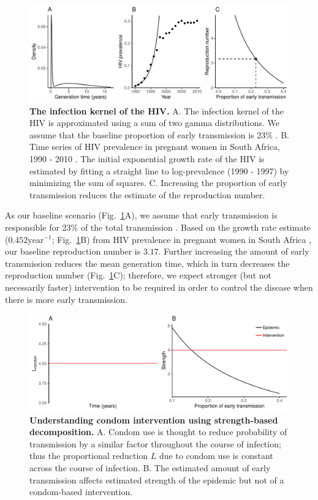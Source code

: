 \documentclass[12pt]{article}\usepackage[]{graphicx}\usepackage[]{color}
\newcommand{\figref}[1]{Fig.~\ref{fig:#1}}
\newcommand{\figlab}[1]{\label{fig:#1}}
\begin{document}
\begin{figure}[!t]
\includegraphics[width=\textwidth]{../figure/figure1.pdf}
\caption{
\textbf{The infection kernel of the HIV.}
A. The infection kernel of the HIV is approximated using a sum of two gamma distributions. We assume that the baseline proportion of early transmission is 23\% \citep{hayes2006amplified}.
B. Time series of HIV prevalence in pregnant women in South Africa, 1990 - 2010 \citep{barron2013eliminating}. The initial exponential growth rate of the HIV is estimated by fitting a straight line to log-prevalence (1990 - 1997) by minimizing the sum of squares.
C. Increasing the proportion of early transmission reduces the estimate of the reproduction number.
}
\figlab{example}
\end{figure}

As our baseline scenario (\figref{example}A), we assume that early transmission is responsible for 23\% of the total transmission \citep{hayes2006amplified}.
Based on the growth rate estimate ($0.452 \textrm{year}^{-1}$; \figref{example}B) from HIV prevalence in pregnant women in South Africa \citep{barron2013eliminating}, our baseline reproduction number is $3.17$.
Further increasing the amount of early transmission reduces the mean generation time, which in turn decreases the reproduction number (\figref{example}C);
therefore, we expect stronger (but not necessarily faster) intervention to be required in order to control the disease when there is more early transmission.

\begin{figure}[!t]
\includegraphics[width=\textwidth]{../figure/figure2.pdf}
\caption{
\textbf{Understanding condom intervention using strength-based decomposition.}
A. Condom use is thought to reduce probability of transmission by a similar factor throughout the course of infection; thus the proportional reduction $L$ due to condom use is constant across the course of infection. 
B. The estimated amount of early transmission affects estimated strength of the epidemic but not of a condom-based intervention.
}
\figlab{condom}
\end{figure}
\end{document}
